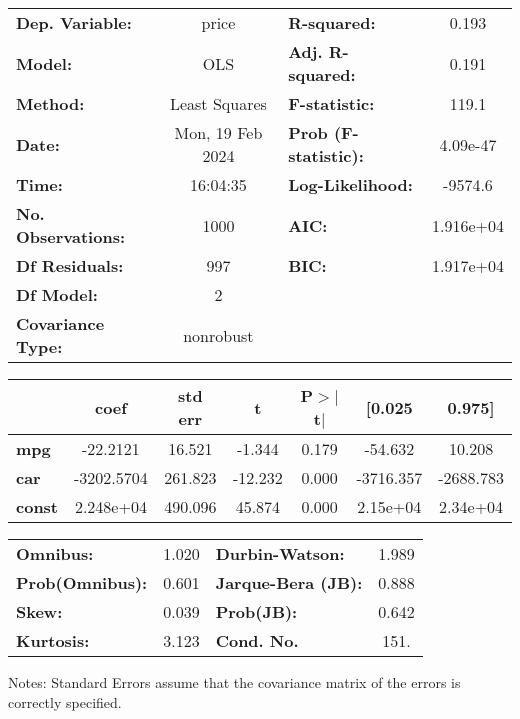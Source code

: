 \begin{center}
\begin{tabular}{lclc}
\toprule
\textbf{Dep. Variable:}    &      price       & \textbf{  R-squared:         } &     0.193   \\
\textbf{Model:}            &       OLS        & \textbf{  Adj. R-squared:    } &     0.191   \\
\textbf{Method:}           &  Least Squares   & \textbf{  F-statistic:       } &     119.1   \\
\textbf{Date:}             & Mon, 19 Feb 2024 & \textbf{  Prob (F-statistic):} &  4.09e-47   \\
\textbf{Time:}             &     16:04:35     & \textbf{  Log-Likelihood:    } &   -9574.6   \\
\textbf{No. Observations:} &        1000      & \textbf{  AIC:               } & 1.916e+04   \\
\textbf{Df Residuals:}     &         997      & \textbf{  BIC:               } & 1.917e+04   \\
\textbf{Df Model:}         &           2      & \textbf{                     } &             \\
\textbf{Covariance Type:}  &    nonrobust     & \textbf{                     } &             \\
\bottomrule
\end{tabular}
\begin{tabular}{lcccccc}
               & \textbf{coef} & \textbf{std err} & \textbf{t} & \textbf{P$> |$t$|$} & \textbf{[0.025} & \textbf{0.975]}  \\
\midrule
\textbf{mpg}   &     -22.2121  &       16.521     &    -1.344  &         0.179        &      -54.632    &       10.208     \\
\textbf{car}   &   -3202.5704  &      261.823     &   -12.232  &         0.000        &    -3716.357    &    -2688.783     \\
\textbf{const} &    2.248e+04  &      490.096     &    45.874  &         0.000        &     2.15e+04    &     2.34e+04     \\
\bottomrule
\end{tabular}
\begin{tabular}{lclc}
\textbf{Omnibus:}       &  1.020 & \textbf{  Durbin-Watson:     } &    1.989  \\
\textbf{Prob(Omnibus):} &  0.601 & \textbf{  Jarque-Bera (JB):  } &    0.888  \\
\textbf{Skew:}          &  0.039 & \textbf{  Prob(JB):          } &    0.642  \\
\textbf{Kurtosis:}      &  3.123 & \textbf{  Cond. No.          } &     151.  \\
\bottomrule
\end{tabular}
\end{center}

Notes: \newline
 [1] Standard Errors assume that the covariance matrix of the errors is correctly specified.